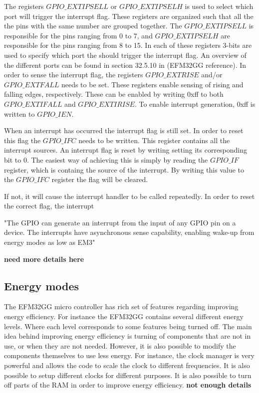 The registers $GPIO\_EXTIPSELL$ or $GPIO\_EXTIPSELH$ is used to select which port will trigger the interrupt flag. These registers are organized such that all the the pins with the same number are grouped together. The $GPIO\_EXTIPSELL$ is responsible for the pins ranging from 0 to 7, and $GPIO\_EXTIPSELH$ are responsible for the pins ranging from 8 to 15. In each of these registers 3-bits are used to specify which port the should trigger the interrupt flag. An overview of the different ports can be found in section 32.5.10 in (EFM32GG reference). In order to sense the interrupt flag, the registers $GPIO\_EXTRISE$ and/or $GPIO\_EXTFALL$ needs to be set. These registers enable sensing of rising and falling edges, respectively. These can be enabled by writing 0xff to both $GPIO\_EXTIFALL$ and $GPIO\_EXTIRISE$.  To enable interrupt generation, 0xff is written to $GPIO\_IEN$. 


When an interrupt has occurred the interrupt flag is still set. In order to reset this flag the $GPIO\_IFC$ needs to be written. This register contains all the interrupt sources. An interrupt flag is reset by writing setting its corresponding bit to 0. The easiest way of achieving this is simply by reading the $GPIO\_IF$ register, which is containg the source of the interrupt. By writing this value to the $GPIO\_IFC$ register the flag will be cleared.  



If not, it will cause the interrupt handler to be called repeatedly. In order to reset the correct flag, the interrupt 



"The GPIO can generate an interrupt from the input of any GPIO pin on a device. The interrupts have asynchronous sense capability, enabling wake-up from energy modes as low as EM3" 


{\bf need more details here}


\subsection{Energy modes}\label{ch:energy_modes} 
The EFM32GG micro controller has rich set of features regarding improving energy efficiency. For instance the EFM32GG contains several different energy levels. Where each level corresponds to some features being turned off. The main idea behind improving energy efficiency is turning of components that are not in use, or when they are not needed. However, it is also possible to modify the components themselves to use less energy. For instance, the clock manager is very powerful and allows the code to scale the clock to different frequencies. It is also possible to setup different clocks for different purposes. It is also possible to turn off parts of the RAM in order to improve energy efficiency. {\bf not enough details}


